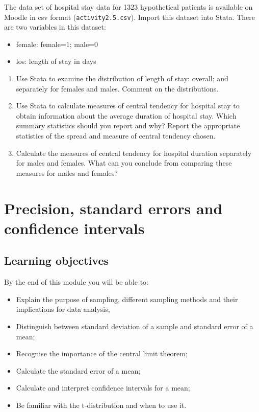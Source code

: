 \documentclass[
]{memoir}
\providecommand{\tightlist}{%
  \setlength{\itemsep}{0pt}\setlength{\parskip}{0pt}}
\begin{document}
The data set of hospital stay data for 1323 hypothetical patients is available on Moodle in csv format (\texttt{activity2.5.csv}). Import this dataset into Stata. There are two variables in this dataset:

\begin{itemize}
\tightlist
\item
  female: female=1; male=0
\item
  los: length of stay in days
\end{itemize}

\begin{enumerate}
\def\labelenumi{\alph{enumi})}
\tightlist
\item
  Use Stata to examine the distribution of length of stay: overall; and separately for females and males. Comment on the distributions.
\item
  Use Stata to calculate measures of central tendency for hospital stay to obtain information about the average duration of hospital stay. Which summary statistics should you report and why? Report the appropriate statistics of the spread and measure of central tendency chosen.
\item
  Calculate the measures of central tendency for hospital duration separately for males and females. What can you conclude from comparing these measures for males and females?
\end{enumerate}

\hypertarget{precision-standard-errors-and-confidence-intervals}{%
\chapter{Precision, standard errors and confidence intervals}\label{precision-standard-errors-and-confidence-intervals}}

\hypertarget{learning-objectives-2}{%
\section*{Learning objectives}\label{learning-objectives-2}}

By the end of this module you will be able to:

\begin{itemize}
\tightlist
\item
  Explain the purpose of sampling, different sampling methods and their implications for data analysis;
\item
  Distinguish between standard deviation of a sample and standard error of a mean;
\item
  Recognise the importance of the central limit theorem;
\item
  Calculate the standard error of a mean;
\item
  Calculate and interpret confidence intervals for a mean;
\item
  Be familiar with the t-distribution and when to use it.
\end{itemize}
\end{document}
